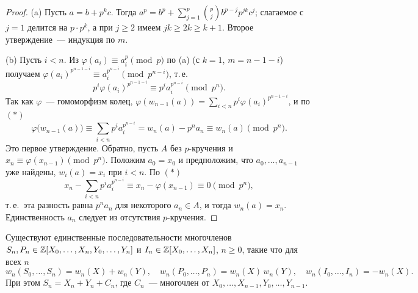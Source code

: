 \begin{proof}
(a) Пусть $a=b+p^kc$. Тогда $a^p=b^p+\sum_{j=1}^p\binom pj b^{p-j}p^{jk}c^j$; слагаемое с $j=1$ делится на $p\cdot p^k$,
а при $j\ge2$ имеем $jk\ge2k\ge k+1$. Второе утверждение~--- индукция по $m$.

(b) Пусть $i<n$. Из $\varphi(a_i)\equiv a_i^p\pmod p$ по (a) (с $k=1$, $m=n-1-i$) получаем
$\varphi(a_i)^{p^{n-1-i}}\equiv a_i^{p^{n-i}}\pmod{p^{n-i}}$, т.\,е.
\[
p^i\varphi(a_i)^{p^{n-1-i}}\equiv p^ia_i^{p^{n-i}}\pmod{p^n}.\tag{$*$}
\]
Так как $\varphi$~--- гомоморфизм колец, $\varphi(w_{n-1}(a))=\sum_{i<n}p^i\varphi(a_i)^{p^{n-1-i}}$, и по $(*)$
\[
\varphi\bigl(w_{n-1}(a)\bigr)\equiv\sum_{i<n}p^ia_i^{p^{n-i}}=w_n(a)-p^na_n\equiv w_n(a)\pmod{p^n}.
\]
Это первое утверждение. Обратно, пусть $A$ без $p$-кручения и $x_n\equiv\varphi(x_{n-1})\pmod{p^n}$. Положим $a_0=x_0$ и
предположим, что $a_0,\dots,a_{n-1}$ уже найдены, $w_i(a)=x_i$ при $i<n$. По $(*)$
\[
x_n-\sum_{i<n}p^ia_i^{p^{n-i}}\equiv x_n-\varphi(x_{n-1})\equiv0\pmod{p^n},
\]
т.\,е.\ эта разность равна $p^na_n$ для некоторого $a_n\in A$, и тогда $w_n(a)=x_n$. Единственность $a_n$ следует из
отсутствия $p$-кручения.
\end{proof}

\begin{theorem}[5.32l: Витт]
Существуют единственные последовательности многочленов $S_n,P_n\in\mathbb Z[X_0,\dots,X_n,Y_0,\dots,Y_n]$ и
$I_n\in\mathbb Z[X_0,\dots,X_n]$, $n\ge0$, такие что для всех $n$
\[
w_n(S_0,\dots,S_n)=w_n(X)+w_n(Y),\quad w_n(P_0,\dots,P_n)=w_n(X)\,w_n(Y),\quad w_n(I_0,\dots,I_n)=-w_n(X).
\]
При этом $S_n=X_n+Y_n+C_n$, где $C_n$~--- многочлен от $X_0,\dots,X_{n-1},Y_0,\dots,Y_{n-1}$.
\end{theorem}

